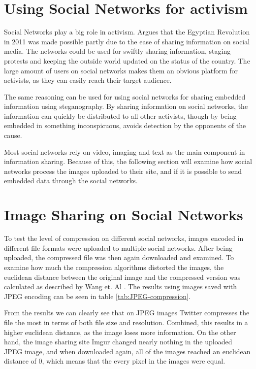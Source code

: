 \clearpage
\section{Using Social Networks for activism}
Social Networks play a big role in activism. 
\citep{IJoC1242} Argues that the Egyptian Revolution in 2011 was made possible partly due to the ease of sharing information on social media. 
The networks could be used for swiftly sharing information, staging protests and keeping the outside world updated on the status of the country.
The large amount of users on social networks makes them an obvious platform for activists, as they can easily reach their target audience. 

The same reasoning can be used for using social networks for sharing embedded information using steganography. 
By sharing information on social networks, the information can quickly be distributed to all other activists, though by being embedded in something inconspicuous, avoids detection by the opponents of the cause.

Most social networks rely on video, imaging and text as the main component in information sharing.
Because of this, the following section will examine how social networks process the images uploaded to their site, and if it is possible to send embedded data through the social networks.

\section{Image Sharing on Social Networks}

To test the level of compression on different social networks, images encoded in different file formats were uploaded to multiple social networks. 
After being uploaded, the compressed file was then again downloaded and examined.
To examine how much the compression algorithms distorted the images, the euclidean distance between the original image and the compressed version was calculated as described by Wang et. Al \citep{Wang2005}.
The results using images saved with JPEG encoding can be seen in table \ref{tab:JPEG-compression}. 

From the results we can clearly see that on JPEG images Twitter compresses the file the most in terms of both file size and resolution.
Combined, this results in a higher euclidean distance, as the image loses more information. 
On the other hand, the image sharing site Imgur changed nearly nothing in the uploaded JPEG image, and when downloaded again, all of the images reached an euclidean distance of 0, which means that the every pixel in the images were equal.


